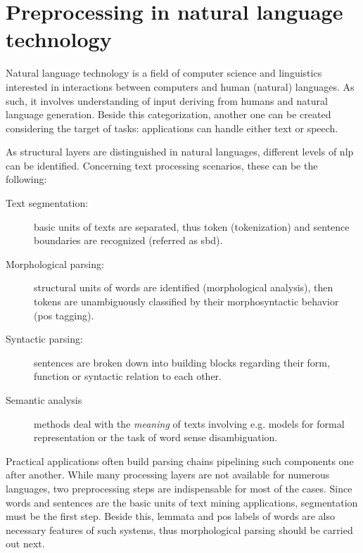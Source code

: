 \section{Preprocessing in natural language technology}



Natural language technology is a field of computer science and linguistics interested in interactions between computers and human (natural) languages. 
As such, it involves understanding of input deriving from humans and natural language generation. 
Beside this categorization, another one can be created considering the target of tasks: applications can handle either text or speech.

As structural layers are distinguished in natural languages, different levels of \gls{nlp} can be identified.
Concerning text processing scenarios, these can be the following:
\begin{description}
\item[Text segmentation:] basic units of texts are separated, thus token (tokenization) and sentence boundaries are recognized (referred as \gls{sbd}).
\item[Morphological parsing:] structural units of words are identified (morphological analysis), then tokens are unambiguously classified by their morphosyntactic behavior (\acrshort{pos} tagging).
\item[Syntactic parsing:] sentences are broken down into building blocks regarding their form, function or syntactic relation to each other.
\item[Semantic analysis] methods deal with the \emph{meaning} of texts involving e.g. models for formal representation or the task of word sense disambiguation.
\end{description}

Practical applications often build parsing chains pipelining such components one after another. 
While many processing layers are not available for numerous languages, two preprocessing steps are indispensable for most of the cases.
Since words and sentences are the basic units of text mining applications, segmentation must be the first step.
Beside this, lemmata and \acrshort{pos} labels of words are also necessary features of such systems, thus morphological parsing should be carried out next.

